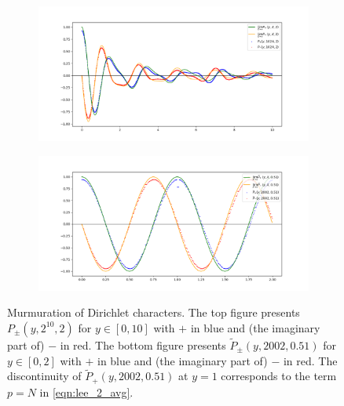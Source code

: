 \begin{figure}[htp] 
\centering
    \begin{subfigure}{1.0\textwidth}
        \centering
        \includegraphics[width=\textwidth]{src/lop_fig1_top.png}%
        \label{fig:lop_fig1_top}
    \end{subfigure}
    
    \begin{subfigure}{1.0\textwidth}
        \centering
        \includegraphics[width=\textwidth]{src/lop_fig1_bottom.png}%
        \label{fig:lop_fig1_bottom}
    \end{subfigure}

    \caption{Murmuration of Dirichlet characters. The top figure presents $P_{\pm}(y, 2^{10}, 2)$ for $y \in [0, 10]$ with $+$ in blue and (the imaginary part of) $-$ in red. The bottom figure presents $\widetilde{P}_{\pm}(y, 2002, 0.51)$ for $y \in [0, 2]$ with $+$ in blue and (the imaginary part of) $-$ in red. The discontinuity of $\widetilde{P}_{+}(y, 2002, 0.51)$ at $y = 1$ corresponds to the term $p = N$ in \eqref{eqn:lee_2_avg}.}
\label{fig:lop}
\end{figure}



